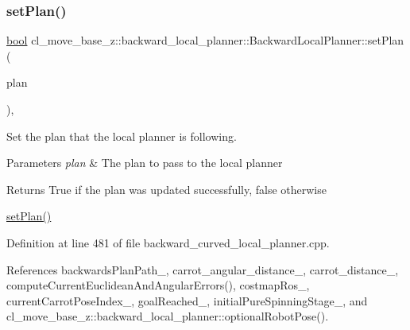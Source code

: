 \mbox{\label{classcl__move__base__z_1_1backward__local__planner_1_1BackwardLocalPlanner_ab11a0eec45f24b5a5a3987a50427eed4}} 
\subsubsection{\texorpdfstring{set\+Plan()}{setPlan()}}
{\footnotesize\ttfamily \hyperlink{classbool}{bool} cl\+\_\+move\+\_\+base\+\_\+z\+::backward\+\_\+local\+\_\+planner\+::\+Backward\+Local\+Planner\+::set\+Plan (\begin{DoxyParamCaption}\item[{const std\+::vector$<$ geometry\+\_\+msgs\+::\+Pose\+Stamped $>$ \&}]{plan }\end{DoxyParamCaption})\hspace{0.3cm}{\ttfamily [override]}, {\ttfamily [virtual]}}



Set the plan that the local planner is following. 


\begin{DoxyParams}{Parameters}
{\em plan} & The plan to pass to the local planner \\
\hline
\end{DoxyParams}
\begin{DoxyReturn}{Returns}
True if the plan was updated successfully, false otherwise
\end{DoxyReturn}
\hyperlink{classcl__move__base__z_1_1backward__local__planner_1_1BackwardLocalPlanner_ab11a0eec45f24b5a5a3987a50427eed4}{set\+Plan()} 

Definition at line 481 of file backward\+\_\+curved\+\_\+local\+\_\+planner.\+cpp.



References backwards\+Plan\+Path\+\_\+, carrot\+\_\+angular\+\_\+distance\+\_\+, carrot\+\_\+distance\+\_\+, compute\+Current\+Euclidean\+And\+Angular\+Errors(), costmap\+Ros\+\_\+, current\+Carrot\+Pose\+Index\+\_\+, goal\+Reached\+\_\+, initial\+Pure\+Spinning\+Stage\+\_\+, and cl\+\_\+move\+\_\+base\+\_\+z\+::backward\+\_\+local\+\_\+planner\+::optional\+Robot\+Pose().



